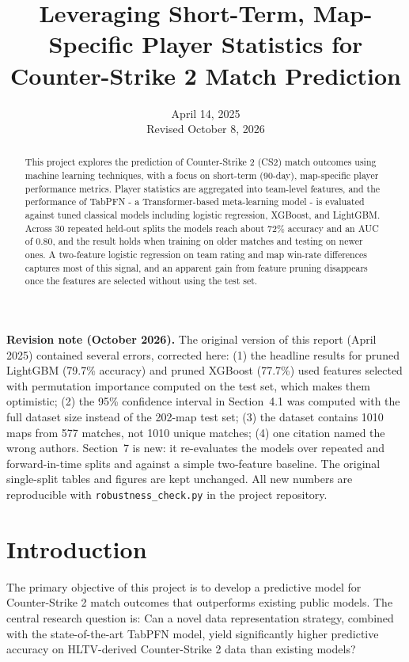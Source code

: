 \documentclass[11pt]{article}
\title{Leveraging Short-Term, Map-Specific Player Statistics for Counter-Strike 2 Match Prediction }
\author{}
\date{April 14, 2025 \\ \small Revised October 8, 2026}
\begin{document}
\maketitle

\begin{abstract}
This project explores the prediction of Counter-Strike 2 (CS2) match outcomes using machine learning techniques, with a focus on short-term (90-day), map-specific player performance metrics. Player statistics are aggregated into team-level features, and the performance of TabPFN - a Transformer-based meta-learning model - is evaluated against tuned classical models including logistic regression, XGBoost, and LightGBM. Across 30 repeated held-out splits the models reach about 72\% accuracy and an AUC of 0.80, and the result holds when training on older matches and testing on newer ones. A two-feature logistic regression on team rating and map win-rate differences captures most of this signal, and an apparent gain from feature pruning disappears once the features are selected without using the test set.
\end{abstract}

\begin{mdframed}
\small\textbf{Revision note (October 2026).} The original version of this report (April 2025) contained several errors, corrected here: (1) the headline results for pruned LightGBM (79.7\% accuracy) and pruned XGBoost (77.7\%) used features selected with permutation importance computed on the test set, which makes them optimistic; (2) the 95\% confidence interval in Section~4.1 was computed with the full dataset size instead of the 202-map test set; (3) the dataset contains 1010 maps from 577 matches, not 1010 unique matches; (4) one citation named the wrong authors. Section~7 is new: it re-evaluates the models over repeated and forward-in-time splits and against a simple two-feature baseline. The original single-split tables and figures are kept unchanged. All new numbers are reproducible with \texttt{robustness\_check.py} in the project repository.
\end{mdframed}

\tableofcontents
\newpage
\section{Introduction}
The primary objective of this project is to develop a predictive model for Counter-Strike 2 match outcomes that outperforms existing public models. The central research question is: Can a novel data representation strategy, combined with the state-of-the-art TabPFN model, yield significantly higher predictive accuracy on HLTV-derived Counter-Strike 2 data than existing models?
\end{document}
